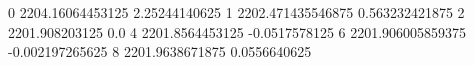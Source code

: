 0 2204.16064453125 2.25244140625
1 2202.471435546875 0.563232421875
2 2201.908203125 0.0
4 2201.8564453125 -0.0517578125
6 2201.906005859375 -0.002197265625
8 2201.9638671875 0.0556640625
